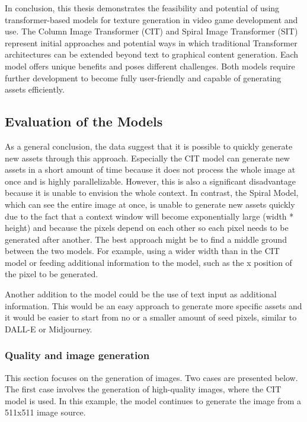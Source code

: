 
    In conclusion, this thesis demonstrates the feasibility and potential of using transformer-based models for texture generation in video game development and use. The Column Image Transformer (CIT) and Spiral Image Transformer (SIT) represent initial approaches and potential ways in which traditional Transformer architectures can be extended beyond text to graphical content generation. Each model offers unique benefits and poses different challenges. Both models require further development to become fully user-friendly and capable of generating assets efficiently.

\subsection{Evaluation of the Models}

    As a general conclusion, the data suggest that it is possible to quickly generate new assets through this approach. Especially the CIT model can generate new assets in a short amount of time because it does not process the whole image at once and is highly parallelizable. However, this is also a significant disadvantage because it is unable to envision the whole context. In contrast, the Spiral Model, which can see the entire image at once, is unable to generate new assets quickly due to the fact that a context window will become exponentially large (width * height) and because the pixels depend on each other so each pixel needs to be generated after another. The best approach might be to find a middle ground between the two models. For example, using a wider width than in the CIT model or feeding additional information to the model, such as the x position of the pixel to be generated.

    Another addition to the model could be the use of text input as additional information. This would be an easy approach to generate more specific assets and it would be easier to start from no or a smaller amount of seed pixels, similar to DALL-E or Midjourney.

    \subsubsection{Quality and image generation}
    This section focuses on the generation of images. Two cases are presented below. The first case involves the generation of high-quality images, where the CIT model is used. In this example, the model continues to generate the image from a 511x511 image source.
    
